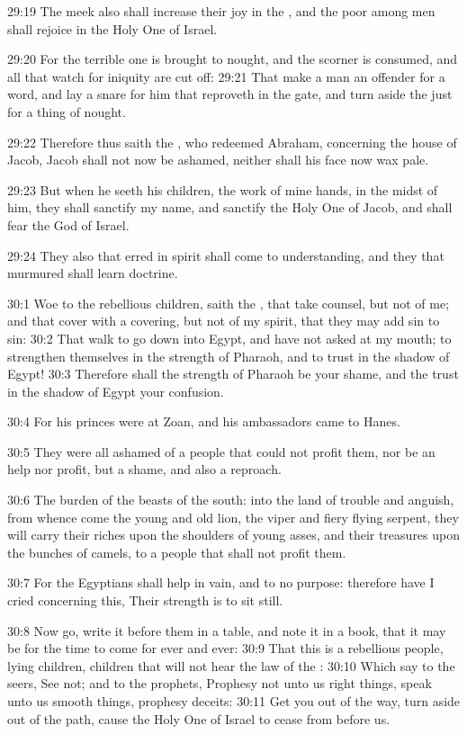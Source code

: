 29:19 The meek also shall increase their joy in the \LORD, and the poor
among men shall rejoice in the Holy One of Israel.

29:20 For the terrible one is brought to nought, and the scorner is
consumed, and all that watch for iniquity are cut off: 29:21 That make
a man an offender for a word, and lay a snare for him that reproveth
in the gate, and turn aside the just for a thing of nought.

29:22 Therefore thus saith the \LORD, who redeemed Abraham, concerning
the house of Jacob, Jacob shall not now be ashamed, neither shall his
face now wax pale.

29:23 But when he seeth his children, the work of mine hands, in the
midst of him, they shall sanctify my name, and sanctify the Holy One
of Jacob, and shall fear the God of Israel.

29:24 They also that erred in spirit shall come to understanding, and
they that murmured shall learn doctrine.

30:1 Woe to the rebellious children, saith the \LORD, that take
counsel, but not of me; and that cover with a covering, but not of my
spirit, that they may add sin to sin: 30:2 That walk to go down into
Egypt, and have not asked at my mouth; to strengthen themselves in the
strength of Pharaoh, and to trust in the shadow of Egypt!  30:3
Therefore shall the strength of Pharaoh be your shame, and the trust
in the shadow of Egypt your confusion.

30:4 For his princes were at Zoan, and his ambassadors came to Hanes.

30:5 They were all ashamed of a people that could not profit them, nor
be an help nor profit, but a shame, and also a reproach.

30:6 The burden of the beasts of the south: into the land of trouble
and anguish, from whence come the young and old lion, the viper and
fiery flying serpent, they will carry their riches upon the shoulders
of young asses, and their treasures upon the bunches of camels, to a
people that shall not profit them.

30:7 For the Egyptians shall help in vain, and to no purpose:
therefore have I cried concerning this, Their strength is to sit
still.

30:8 Now go, write it before them in a table, and note it in a book,
that it may be for the time to come for ever and ever: 30:9 That this
is a rebellious people, lying children, children that will not hear
the law of the \LORD: 30:10 Which say to the seers, See not; and to the
prophets, Prophesy not unto us right things, speak unto us smooth
things, prophesy deceits: 30:11 Get you out of the way, turn aside out
of the path, cause the Holy One of Israel to cease from before us.


